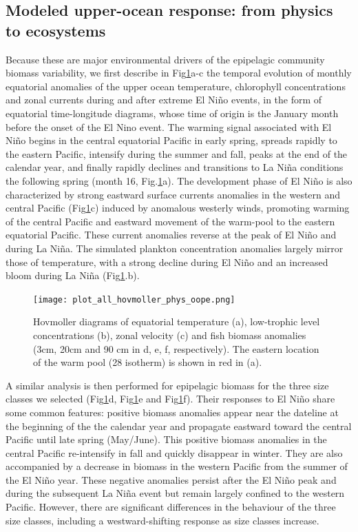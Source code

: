 \subsection{Modeled upper-ocean response: from physics to ecosystems}

Because these are major environmental drivers of the epipelagic community biomass variability, we first describe in Fig\ref{fig:hov_nemo_ape}a-c the temporal evolution of monthly equatorial anomalies of the upper ocean temperature, chlorophyll concentrations and zonal currents during and after extreme El Niño events, in the form of equatorial time-longitude diagrams, whose time of origin is the January month before the onset of the El Nino event. The warming signal associated with El Niño begins in the central equatorial Pacific in early spring, spreads rapidly to the eastern Pacific, intensify during the summer and fall, peaks at the end of the calendar year, and finally rapidly declines and transitions to La Niña conditions the following spring (month 16, Fig.\ref{fig:hov_nemo_ape}a). The development phase of El Niño is also characterized by strong  eastward surface currents anomalies in the western and central Pacific (Fig\ref{fig:hov_nemo_ape}c) induced by anomalous westerly winds, promoting warming of the central Pacific and eastward movement of the warm-pool to the eastern equatorial Pacific. These current anomalies reverse at the peak of El Niño and during La Niña. The simulated plankton concentration anomalies largely mirror those of temperature, with a strong decline during El Niño and an increased bloom during La Niña (Fig\ref{fig:hov_nemo_ape}.b). 

\begin{figure}[h!tp]
	\centering
	\texttt{[image: plot\_all\_hovmoller\_phys\_oope.png]}	
	\caption{Hovmoller diagrams of equatorial temperature (a), low-trophic level concentrations (b), zonal velocity (c) and fish biomass anomalies (3cm, 20cm and 90 cm in d, e, f, respectively). The eastern location of the warm pool (28\degree{} isotherm) is shown in red in (a).}	
	\label{fig:hov_nemo_ape}
\end{figure}

A similar analysis is then performed for epipelagic biomass for the three size classes we selected (Fig\ref{fig:hov_nemo_ape}d, Fig\ref{fig:hov_nemo_ape}e and Fig\ref{fig:hov_nemo_ape}f). Their responses to El Niño share some common features: positive biomass anomalies appear near the dateline at the beginning of the the calendar year and propagate eastward toward the central Pacific until late spring (May/June). This positive biomass anomalies in the central Pacific re-intensify in fall and quickly disappear in winter. They are also accompanied by a decrease in biomass in the western Pacific from the summer of the El Niño year. These negative anomalies persist after the El Niño peak and during the subsequent La Niña event but remain largely confined to the western Pacific. However, there are significant differences in the behaviour of the three size classes, including a westward-shifting response as size classes increase.


